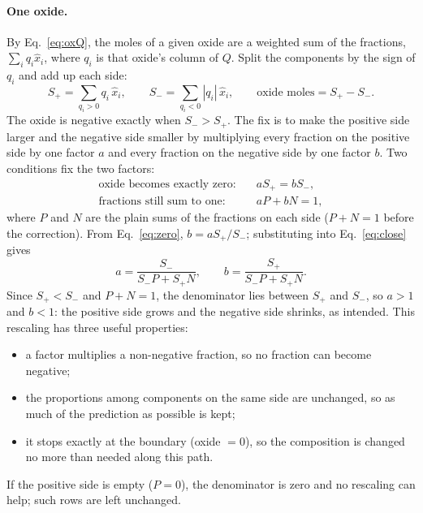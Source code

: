 \documentclass[11pt]{article}
\begin{document}
\paragraph{One oxide.} By Eq.~\eqref{eq:oxQ}, the moles of a given oxide are a weighted
sum of the fractions, $\sum_i q_i \hat x_i$, where $q_i$ is that oxide's column of $Q$.
Split the components by the sign of $q_i$ and add up each side:
\begin{equation}
  S_+ = \sum_{q_i > 0} q_i\,\hat x_i, \qquad
  S_- = \sum_{q_i < 0} |q_i|\,\hat x_i, \qquad
  \text{oxide moles} = S_+ - S_- .
\end{equation}
The oxide is negative exactly when $S_- > S_+$. The fix is to make the positive side larger
and the negative side smaller by multiplying every fraction on the positive side by one
factor $a$ and every fraction on the negative side by one factor $b$. Two conditions fix the
two factors:
\begin{align}
  \text{oxide becomes exactly zero:}\quad & a S_+ = b S_-, \label{eq:zero}\\
  \text{fractions still sum to one:}\quad & a P + b N = 1, \label{eq:close}
\end{align}
where $P$ and $N$ are the plain sums of the fractions on each side ($P + N = 1$ before the
correction). From Eq.~\eqref{eq:zero}, $b = a S_+/S_-$; substituting into
Eq.~\eqref{eq:close} gives
\begin{equation}
  a = \frac{S_-}{S_- P + S_+ N}, \qquad
  b = \frac{S_+}{S_- P + S_+ N}.
  \label{eq:ab}
\end{equation}
Since $S_+ < S_-$ and $P + N = 1$, the denominator lies between $S_+$ and $S_-$, so
$a > 1$ and $b < 1$: the positive side grows and the negative side shrinks, as intended.
This rescaling has three useful properties:
\begin{itemize}[nosep]
  \item a factor multiplies a non-negative fraction, so no fraction can become negative;
  \item the proportions among components on the same side are unchanged, so as much of the
        prediction as possible is kept;
  \item it stops exactly at the boundary (oxide $= 0$), so the composition is changed no
        more than needed along this path.
\end{itemize}
If the positive side is empty ($P = 0$), the denominator is zero and no rescaling can help;
such rows are left unchanged.
\end{document}
